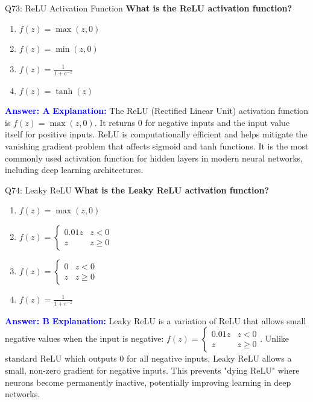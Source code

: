 \documentclass[8pt]{beamer}
\begin{document}
	\begin{frame}{Q73: ReLU Activation Function}
		\fontsize{6.5}{7.5}\selectfont
		\textbf{What is the ReLU activation function?}
		\begin{enumerate}
			\item $f(z) = \max(z, 0)$
			\item $f(z) = \min(z, 0)$
			\item $f(z) = \frac{1}{1 + e^{-z}}$
			\item $f(z) = \tanh(z)$
		\end{enumerate}
		\vspace{0.1cm}
		\textcolor{blue}{\textbf{Answer: A}}
		\vspace{0.1cm}
		\textcolor{blue}{\textbf{Explanation:}} The ReLU (Rectified Linear Unit) activation function is $f(z) = \max(z, 0)$. It returns 0 for negative inputs and the input value itself for positive inputs. ReLU is computationally efficient and helps mitigate the vanishing gradient problem that affects sigmoid and tanh functions. It is the most commonly used activation function for hidden layers in modern neural networks, including deep learning architectures.
	\end{frame}
	
	\begin{frame}{Q74: Leaky ReLU}
		\fontsize{6.5}{7.5}\selectfont
		\textbf{What is the Leaky ReLU activation function?}
		\begin{enumerate}
			\item $f(z) = \max(z, 0)$
			\item $f(z) = \begin{cases} 0.01z & z < 0 \\ z & z \geq 0 \end{cases}$
			\item $f(z) = \begin{cases} 0 & z < 0 \\ z & z \geq 0 \end{cases}$
			\item $f(z) = \frac{1}{1 + e^{-z}}$
		\end{enumerate}
		\vspace{0.1cm}
		\textcolor{blue}{\textbf{Answer: B}}
		\vspace{0.1cm}
		\textcolor{blue}{\textbf{Explanation:}} Leaky ReLU is a variation of ReLU that allows small negative values when the input is negative: $f(z) = \begin{cases} 0.01z & z < 0 \\ z & z \geq 0 \end{cases}$. Unlike standard ReLU which outputs 0 for all negative inputs, Leaky ReLU allows a small, non-zero gradient for negative inputs. This prevents "dying ReLU" where neurons become permanently inactive, potentially improving learning in deep networks.
	\end{frame}
	
\end{document}

